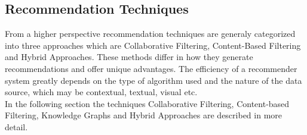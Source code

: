 \documentclass[\myFontSize,a4paper,oneside,hidelinks]{article}
\begin{document}

\clearpage

\subsection{Recommendation Techniques}
From a higher perspective recommendation techniques are generaly categorized into three approaches which are Collaborative Filtering, Content-Based Filtering and Hybrid Approaches. These methods differ in how they generate recommendations and offer unique advantages. The efficiency of a recommender system greatly depends on the type of algorithm used and the nature of the data source, which may be contextual, textual, visual etc. \cite{Roy2022}\\
In the following section the techniques Collaborative Filtering, Content-based Filtering, Knowledge Graphs and Hybrid Approaches are described in more detail.
%
\end{document}
